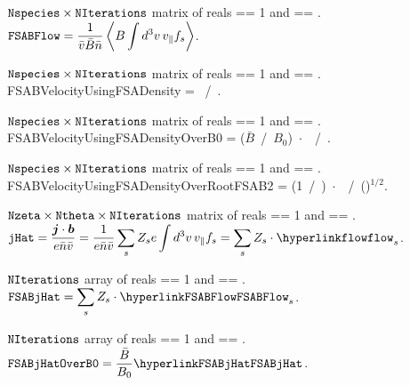 \myhrule

{$\text{\ttfamily Nspecies} \times \text{\ttfamily NIterations}$ matrix of reals}
{ == 1 and  == \true.}
{$\displaystyle \text{\ttfamily FSABFlow} =  \frac{1}{\bar{v} \bar{B} \bar{n}} \left\langle B \int d^3v \, v_{\|} f_s \right\rangle$.}

\myhrule

{$\text{\ttfamily Nspecies} \times \text{\ttfamily NIterations}$ matrix of reals}
{ == 1 and  == \true.}
{{\ttfamily FSABVelocityUsingFSADensity} =  ~/~.}

\myhrule

{$\text{\ttfamily Nspecies} \times \text{\ttfamily NIterations}$ matrix of reals}
{ == 1 and  == \true.}
{{\ttfamily FSABVelocityUsingFSADensityOverB0} =  ($\bar{B}$~/~$B_0$)~$\cdot$~~/~.}

\myhrule

{$\text{\ttfamily Nspecies} \times \text{\ttfamily NIterations}$ matrix of reals}
{ == 1 and  == \true.}
{{\ttfamily FSABVelocityUsingFSADensityOverRootFSAB2} =  (1~/~)~$\cdot$~~/~()${}^{1/2}$.}

\myhrule

{$\text{\ttfamily Nzeta} \times \text{\ttfamily Ntheta} \times \text{\ttfamily NIterations}$ matrix of reals}
{ == 1 and  == \true.}
{$\displaystyle \text{\ttfamily jHat} = \frac{\bm{j} \cdot \bm{b}}{e \bar{n} \bar{v}} = \frac{1}{e \bar{n} \bar{v}} \sum_s Z_s e \int d^3v \, v_{\|} f_s = \sum_s Z_s \cdot \text{\parlink{flow}}_s$.}

\myhrule

{$\text{\ttfamily NIterations}$ array of reals}
{ == 1 and  == \true.}
{$\displaystyle \text{\ttfamily FSABjHat} =  \sum_s Z_s \cdot \text{\parlink{FSABFlow}}_s$.}

\myhrule

{$\text{\ttfamily NIterations}$ array of reals}
{ == 1 and  == \true.}
{$\displaystyle \text{\ttfamily FSABjHatOverB0} =  \frac{\bar{B}}{B_0} \text{\parlink{FSABjHat}}$.}

